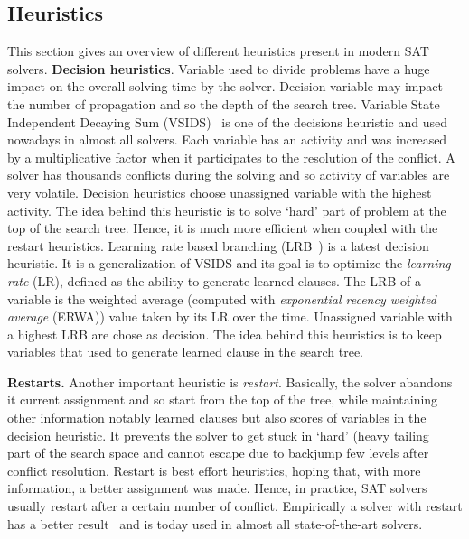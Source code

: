 \subsection{Heuristics}\label{sec:heuristics}
This section gives an overview of different heuristics present in modern SAT solvers.
\textbf{Decision heuristics}. Variable used to divide problems have a huge impact on the 
overall solving time by the solver. Decision variable may impact the number of propagation and so 
the depth of the search tree.
Variable State Independent Decaying Sum (VSIDS)~\cite{moskewicz2001chaff} is one of the decisions heuristic and used
nowadays in almost all solvers. Each variable has an activity and was increased by a multiplicative factor 
when it participates to the resolution of the conflict.
A solver has thousands conflicts during the solving and so activity of variables are very volatile.
Decision heuristics choose unassigned variable with the highest activity.
The idea behind this heuristic is to solve ‘hard’ part of problem at the top of the search tree.
Hence, it is much more efficient when coupled with the restart heuristics. 
Learning rate based branching (LRB~\cite{liang2016learning}) is a latest decision heuristic. It is a
generalization of VSIDS and its goal is to optimize the \emph{learning rate} (LR), defined as the ability to generate
learned clauses. The LRB of a variable is the weighted average (computed with \emph{exponential recency
weighted average} (ERWA))  value taken by its LR over the time. Unassigned variable with a highest LRB are chose as decision. 
The idea behind this heuristics is to keep variables that used to generate learned clause in the search tree.

\textbf{Restarts.}
Another important heuristic is \emph{restart}. Basically, the solver abandons it current assignment and so 
start from the top of the tree, while maintaining other information notably learned clauses but also scores of variables in the decision heuristic. 
It prevents the solver to get stuck in ‘hard’ (heavy tailing~\cite{gomes1997heavy} part of the search space and cannot escape due 
to backjump few levels after conflict resolution. Restart is best effort heuristics, hoping that,
with more information, a better assignment was made. Hence, in practice, SAT solvers usually restart after a
certain number of conflict. Empirically a solver with restart has a better result~\cite{huang2007effect} and is today
used in almost all state-of-the-art solvers.

